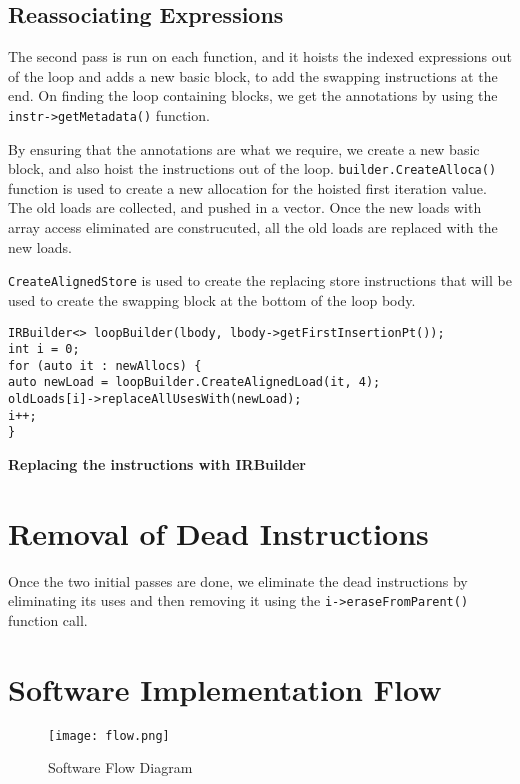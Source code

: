 \subsection{Reassociating Expressions}
The second pass is run on each function, and it hoists the indexed expressions out of the loop and adds a new basic block, to add the swapping instructions at the end. On finding the loop containing blocks, we get the annotations by using the \texttt{instr->getMetadata()} function. 

By ensuring that the annotations are what we require, we create a new basic block, and also hoist the instructions out of the loop. \texttt{builder.CreateAlloca()} function is used to create a new allocation for the hoisted first iteration value. The old loads are collected, and pushed in a vector. Once the new loads with array access eliminated are construcuted, all the old loads are replaced with the new loads. 

\texttt{CreateAlignedStore} is used to create the replacing store instructions that will be used to create the swapping block at the bottom of the loop body. 

\begin{lstlisting}
IRBuilder<> loopBuilder(lbody, lbody->getFirstInsertionPt());
int i = 0;
for (auto it : newAllocs) {
auto newLoad = loopBuilder.CreateAlignedLoad(it, 4);
oldLoads[i]->replaceAllUsesWith(newLoad);
i++;
}

\end{lstlisting}
\hspace{55pt} \textbf{Replacing the instructions with IRBuilder}

\section{Removal of Dead Instructions}
Once the two initial passes are done, we eliminate the dead instructions by eliminating its uses and then removing it using the \texttt{i->eraseFromParent()} function call.

\section{Software Implementation Flow}

\begin{figure}[H]
	\centering
	\texttt{[image: flow.png]}
	\caption{Software Flow Diagram}
	\label{Software Flow}	
\end{figure}
